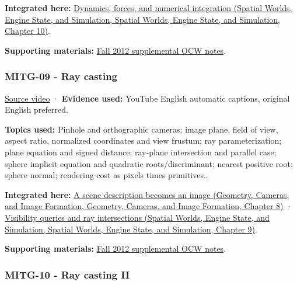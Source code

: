 \textbf{Integrated here:} \href{../05-Spatial-Worlds-Engine-State-and-Simulation/main.pdf\#nameddest=04-visual-computing-ii-ch029-dynamics-forces-and-numerical-integration}{Dynamics, forces, and numerical integration (Spatial Worlds, Engine State, and Simulation, Spatial Worlds, Engine State, and Simulation, Chapter 10)}.

\textbf{Supporting materials:} \href{https://ocw.mit.edu/courses/6-837-computer-graphics-fall-2012/pages/lecture-notes/}{Fall 2012 supplemental OCW notes}.

\subsubsection{MITG-09 - Ray casting}\label{04-visual-computing-ii-ch036-mitg-09---ray-casting}

\href{https://www.youtube.com/watch?v=mJHGcDc37kY}{Source video} · \textbf{Evidence used:} YouTube English automatic captions, original English preferred.

\textbf{Topics used:} Pinhole and orthographic cameras; image plane, field of view, aspect ratio, normalized coordinates and view frustum; ray parameterization; plane equation and signed distance; ray-plane intersection and parallel case; sphere implicit equation and quadratic roots/discriminant; nearest positive root; sphere normal; rendering cost as pixels times primitives..

\textbf{Integrated here:} \href{../03-Geometry-Cameras-and-Image-Formation/main.pdf\#nameddest=03-visual-computing-i-ch001-a-scene-description-becomes-an-image}{A scene description becomes an image (Geometry, Cameras, and Image Formation, Geometry, Cameras, and Image Formation, Chapter 8)} · \href{../05-Spatial-Worlds-Engine-State-and-Simulation/main.pdf\#nameddest=04-visual-computing-ii-ch028-visibility-queries-and-ray-intersections-1}{Visibility queries and ray intersections (Spatial Worlds, Engine State, and Simulation, Spatial Worlds, Engine State, and Simulation, Chapter 9)}.

\textbf{Supporting materials:} \href{https://ocw.mit.edu/courses/6-837-computer-graphics-fall-2012/pages/lecture-notes/}{Fall 2012 supplemental OCW notes}.

\subsubsection{MITG-10 - Ray casting II}\label{04-visual-computing-ii-ch036-mitg-10---ray-casting-ii}

